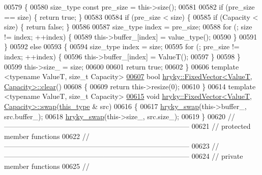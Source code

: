 \begin{DoxyCode}
00579 \{
00580     size\_type \textcolor{keyword}{const} pre\_size = this->size();
00581     
00582     \textcolor{keywordflow}{if} (pre\_size == size) \{ \textcolor{keywordflow}{return} \textcolor{keyword}{true}; \}
00583 
00584     \textcolor{keywordflow}{if} (pre\_size < size) \{
00585         \textcolor{keywordflow}{if} (Capacity < size) \{ \textcolor{keywordflow}{return} \textcolor{keyword}{false}; \}
00586 
00587         size\_type index = pre\_size;
00588         \textcolor{keywordflow}{for} (; size != index; ++index) \{
00589             this->buffer\_[index] = value\_type();
00590         \}
00591     \}
00592     \textcolor{keywordflow}{else}
00593     \{
00594         size\_type index = size;
00595         \textcolor{keywordflow}{for} (; pre\_size != index; ++index) \{
00596             this->buffer\_[index] = ValueT();
00597         \}
00598     \}
00599     this->size\_ = size;
00600 
00601     \textcolor{keywordflow}{return} \textcolor{keyword}{true};
00602 \}
00606 \textcolor{keyword}{template} <\textcolor{keyword}{typename} ValueT, \textcolor{keywordtype}{size\_t} Capacity>
\hypertarget{fixed__vector_8h_source_l00607}{}\hyperlink{classhryky_1_1_fixed_vector_a79d4720139346d618b02738557112a7a}{00607} \textcolor{keywordtype}{bool} \hyperlink{namespacehryky_aa201297ea9530da954a7230be71cc19d}{hryky::FixedVector<ValueT, Capacity>::clear}()
00608 \{
00609     \textcolor{keywordflow}{return} this->resize(0);
00610 \}
00614 \textcolor{keyword}{template} <\textcolor{keyword}{typename} ValueT, \textcolor{keywordtype}{size\_t} Capacity>
\hypertarget{fixed__vector_8h_source_l00615}{}\hyperlink{classhryky_1_1_fixed_vector_a6b0a09a540438463dd2017419a6a600e}{00615} \textcolor{keywordtype}{void} \hyperlink{namespacehryky_a4282146df5ea2b68cb667896a2205909}{hryky::FixedVector<ValueT, Capacity>::swap}(\hyperlink{classhryky_1_1_fixed_vector}{this_type} & src)
00616 \{
00617     \hyperlink{namespacehryky_add9c1c1fdfda07cd47bcb7c16d3a823a}{hryky_swap}(this->buffer\_,      src.buffer\_);
00618     \hyperlink{namespacehryky_add9c1c1fdfda07cd47bcb7c16d3a823a}{hryky_swap}(this->size\_,        src.size\_);
00619 \}
00620 \textcolor{comment}{//
      ------------------------------------------------------------------------------}
00621 \textcolor{comment}{// protected member functions}
00622 \textcolor{comment}{//
      ------------------------------------------------------------------------------}
00623 \textcolor{comment}{//
      ------------------------------------------------------------------------------}
00624 \textcolor{comment}{// private member functions}
00625 \textcolor{comment}{//
}
\end{DoxyCode}
